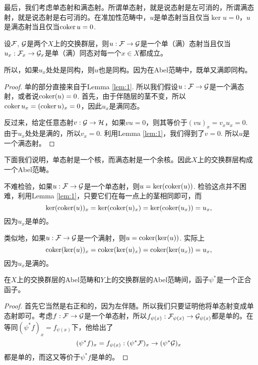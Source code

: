 最后，我们考虑单态射和满态射。所谓单态射，就是说态射是左可消的，所谓满态射，就是说态射是右可消的。在准加性范畴中，$u$是单态射当且仅当$\ker u=0$，$u$是满态射当且仅当$\operatorname{coker} u=0$. 

\begin{lem}
设$\mathcal{F}$, $\mathcal{G}$是两个$X$上的交换群层，则$u:\mathcal{F}\to\mathcal{G}$是一个单（满）态射当且仅当$u_x:\mathcal{F}_x\to\mathcal{G}_x$是单（满）同态对每一个$x\in X$都成立。
\end{lem}

所以，如果$u_x$处处是同构，则$u$也是同构。因为在Abel范畴中，既单又满即同构。

\begin{proof}
单的部分直接来自于Lemma \ref{lem:1}. 所以我们假设$u:\mathcal{F}\to\mathcal{G}$是一个满态射，或者说$\operatorname{coker}(u)=0$. 首先，由于伴随层的茎不变，所以$\operatorname{coker} u_x=(\operatorname{coker} u)_x=0$，因此$u_x$是满同态。

反过来，给定任意态射$v:\mathcal{G}\to\mathcal{H}$，如果$vu=0$，则其等价于$(vu)_x=v_xu_x=0$. 由于$u_x$处处是满的，所以$v_x=0$. 利用Lemma \ref{lem:1}，我们得到了$v=0$. 所以$u$是一个满态射。
\end{proof}

\begin{para}
下面我们说明，单态射是一个核，而满态射是一个余核。因此$X$上的交换群层构成一个Abel范畴。

不难检验，如果$u:\mathcal{F}\to\mathcal{G}$是一个单态射，则$u=\ker(\operatorname{coker}(u))$. 检验这点并不困难，利用Lemma \ref{lem:1}，只要它们在每一点上的茎相同即可，而
\[
	\ker(\operatorname{coker}(u))_x=\ker(\operatorname{coker}(u)_x)=\ker(\operatorname{coker}(u_x))=u_x,
\]
因为$u_x$是单的。

类似地，如果$u:\mathcal{F}\to \mathcal{G}$是一个满射，则$u=\operatorname{coker} (\ker(u))$. 实际上
\[
	\operatorname{coker} (\ker(u))_x=\operatorname{coker}(\ker(u)_x)=\operatorname{coker}(\ker(u_x))=u_x,
\]
因为$u_x$是满的。
\end{para}

\begin{pro}
在$X$上的交换群层的Abel范畴和$Y$上的交换群层的Abel范畴间，函子$\psi^*$是一个正合函子。
\end{pro}

\begin{proof}
首先它当然是右正和的，因为左伴随。所以我们只要证明他将单态射变成单态射即可。考虑$f:\mathcal{F} \to \mathcal{G}$是一个单态射，所以$f_{\psi(x)}:\mathcal{F}_{\psi(x)} \to \mathcal{G}_{\psi(x)}$都是单的。在等同$(\psi^* f)_x=f_{\psi(x)}$下，他给出了
\[
	(\psi^* f)_x=f_{\psi(x)}:(\psi^*\mathcal{F})_{x} \to (\psi^*\mathcal{G})_{x}
\]
都是单的，而这又等价于$\psi^* f$是单的。
\end{proof}


